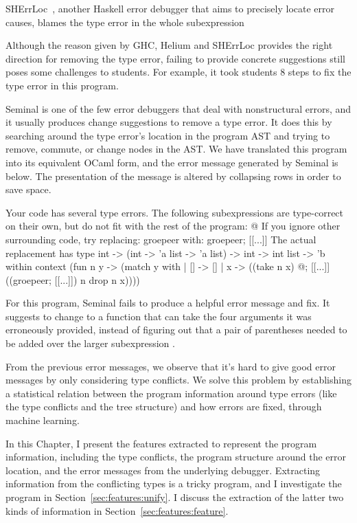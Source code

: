 \documentclass[12pt]{report}	%
\begin{document}
SHErrLoc~\cite{Zhang14:tgd,Zhang15:DTE}, another Haskell error
debugger that aims to precisely locate error causes,
blames the type error in the whole subexpression 


Although the reason given by GHC, Helium and SHErrLoc
provides the right direction for removing the type error, failing to
provide concrete suggestions still poses some challenges to students.
For example, it took students 8 steps to fix the type error in this program.


Seminal \cite{Lerner07:STM} is one of the few error debuggers
that deal with nonstructural errors,
and it usually produces change suggestions to remove a type error.
It does this by searching around the type error's
location
in the program AST and trying to
remove, commute, or change nodes in the AST.
We have translated this program into its equivalent OCaml form,
and the error message generated by Seminal is below.
The presentation of the message is altered by collapsing rows
in order to save space.
%
\begin{program}
Your code has several type errors. The following subexpressions are 
type-correct on their own, but do not fit with the rest of the program:
    @
If you ignore other surrounding code, try replacing: groepeer
with: groepeer; [[...]]
The actual replacement has type
    int -> (int -> 'a list -> 'a list) -> int -> int list -> 'b
within context
    (fun n y -> (match y with
         | [] -> []
         | x -> ((take n x) @; [[...]] ((groepeer; [[...]]) n drop n x))))
\end{program}
%
For this program, Seminal fails to produce a helpful
error message and fix. It suggests to change
 to a function
that can take the four arguments
it was erroneously provided, instead of figuring out that a pair
of parentheses needed to be added over the larger subexpression
. 

From the previous error messages, we observe that it's hard to
give good error messages by only considering type conflicts.
We solve 
this problem by establishing a statistical
relation between the program information around type errors 
(like the type conflicts and the tree structure)
and how errors are fixed, through machine learning.

In this Chapter, I present the features extracted to represent the program information,
including the type conflicts, the program structure around the error location, and the error messages from the underlying debugger.
Extracting information from the conflicting types is a tricky program, and I investigate the program in Section~\ref{sec:features:unify}.
I discuss the extraction of the latter two kinds of information in Section~\ref{sec:features:feature}.
\end{document}
